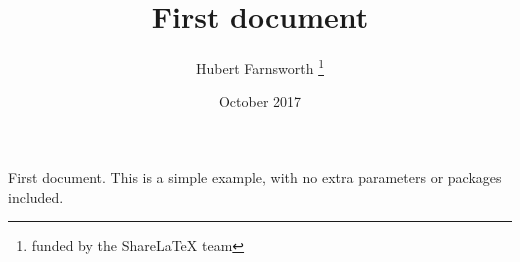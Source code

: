 \documentclass[12pt, a4paper, twoside]{article}
\title{First document}
\author{Hubert Farnsworth  \thanks{funded by the ShareLaTeX team}}
\date{October 2017}
\begin{document}
First document. This is a simple example, with no
extra parameters or packages included.
\end{document}
